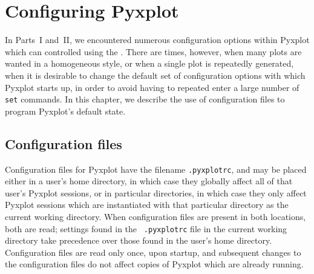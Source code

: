 %
%
%
%
%



\chapter{Configuring Pyxplot}
\label{ch:configuration}

\renewcommand{\arraystretch}{1.80}

In Parts~I and~II, we encountered numerous configuration options within Pyxplot
which can controlled using the . There are times, however, when
many plots are wanted in a homogeneous style, or when a single plot is
repeatedly generated, when it is desirable to change the default set of
configuration options with which Pyxplot starts up, in order to avoid having to
repeated enter a large number of {\tt set} commands. In this chapter, we
describe the use of configuration files to program Pyxplot's default state.

\section{Configuration files}

Configuration files for Pyxplot have the filename {\tt .pyxplotrc}, and may be
placed either in a user's home directory, in which case they globally affect
all of that user's Pyxplot sessions, or in particular directories, in which
case they only affect Pyxplot sessions which are instantiated with that
particular directory as the current working directory.  When configuration
files are present in both locations, both are read; settings found in the {\tt
.pyxplotrc} file in the current working directory take precedence over those
found in the user's home directory. Configuration files are read only once,
upon startup, and subsequent changes to the configuration files do not affect
copies of Pyxplot which are already running.

